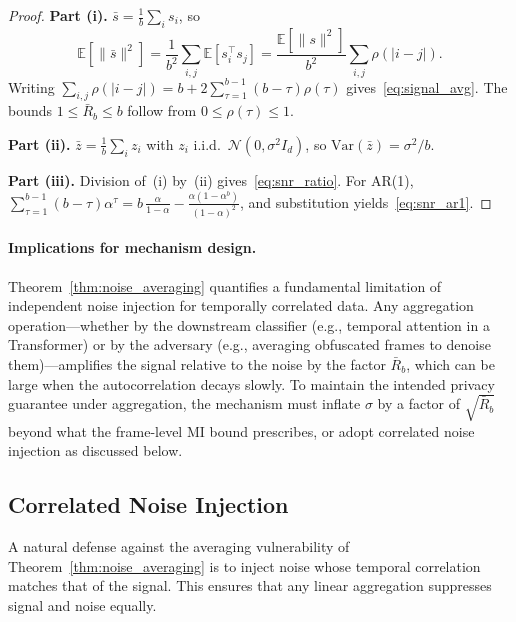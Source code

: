 \documentclass[letterpaper]{article} %
\begin{document}
\begin{proof}
\textbf{Part (i).}
$\bar{s} = \frac{1}{b}\sum_i s_i$, so
\[
\mathbb{E}[\|\bar{s}\|^2]
= \frac{1}{b^2}\sum_{i,j}\mathbb{E}[s_i^\top s_j]
= \frac{\mathbb{E}[\|s\|^2]}{b^2}\sum_{i,j}\rho(|i-j|).
\]
Writing $\sum_{i,j}\rho(|i-j|) = b + 2\sum_{\tau=1}^{b-1}(b-\tau)\rho(\tau)$
gives~\eqref{eq:signal_avg}.  The bounds $1 \le \bar{R}_b \le b$ follow
from $0 \le \rho(\tau) \le 1$.

\textbf{Part (ii).}
$\bar{z} = \frac{1}{b}\sum_i z_i$ with $z_i$ i.i.d.\
$\mathcal{N}(0, \sigma^2 I_d)$, so
$\mathrm{Var}(\bar{z}) = \sigma^2/b$.

\textbf{Part (iii).}
Division of~(i) by~(ii) gives~\eqref{eq:snr_ratio}.
For AR(1), $\sum_{\tau=1}^{b-1}(b-\tau)\alpha^\tau
= b\,\frac{\alpha}{1-\alpha} - \frac{\alpha(1-\alpha^{b})}{(1-\alpha)^2}$,
and substitution yields~\eqref{eq:snr_ar1}.
\end{proof}

\paragraph{Implications for mechanism design.}
Theorem~\ref{thm:noise_averaging} quantifies a fundamental
limitation of independent noise injection for temporally
correlated data.  Any aggregation operation---whether by the
downstream classifier (e.g., temporal attention in a
Transformer) or by the adversary (e.g., averaging obfuscated
frames to denoise them)---amplifies the signal relative to the
noise by the factor $\bar{R}_b$, which can be large when the
autocorrelation decays slowly.  To maintain the intended
privacy guarantee under aggregation, the mechanism must inflate
$\sigma$ by a factor of $\sqrt{\bar{R}_b}$ beyond what the
frame-level MI bound prescribes, or adopt correlated noise
injection as discussed below.

\subsection{Correlated Noise Injection}

A natural defense against the averaging vulnerability of
Theorem~\ref{thm:noise_averaging} is to inject noise whose
temporal correlation matches that of the signal.  This ensures
that any linear aggregation suppresses signal and noise equally.
\end{document}
